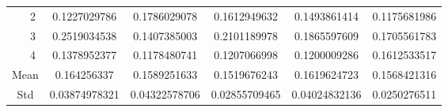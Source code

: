 \documentclass[draft,dvipsnames]{drexel-thesis}
\begin{document}
\begin{thesis}
\begin{table}[!t]
\begin{tabular}{|c|c|c|c|c|c|c|}
                      & 2                   & 0.1227029786  & 0.1786029078  & 0.1612949632  & 0.1493861414  & 0.1175681986 \\ \cline{2-7}
                      & 3                   & 0.2519034538  & 0.1407385003  & 0.2101189978  & 0.1865597609  & 0.1705561783 \\ \cline{2-7}
                      & 4                   & 0.1378952377  & 0.1178480741  & 0.1207066998  & 0.1200009286  & 0.1612533517 \\ \hline
\multicolumn{2}{|c|}{Mean}                  & 0.164256337   & 0.1589251633  & 0.1519676243  & 0.1619624723  & 0.1568421316 \\ \hline
\multicolumn{2}{|c|}{Std}                   & 0.03874978321 & 0.04322578706 & 0.02855709465 & 0.04024832136 & 0.0250276511 \\ \hline
\end{tabular}
\end{table}


\end{thesis}
\end{document}
